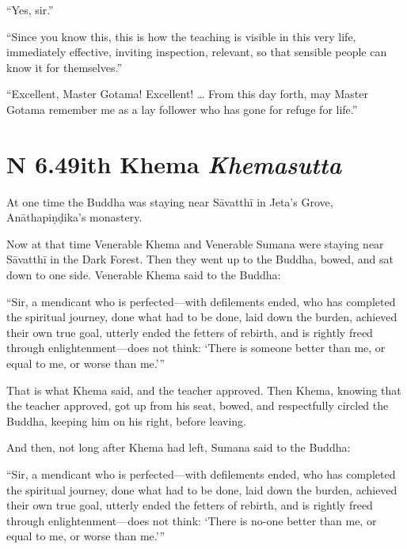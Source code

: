 \documentclass[12pt,openany]{book}%
\newcommand*{\suttatitleacronym}[1]{\smaller[2]{#1}\vspace*{.3em}}
\newcommand*{\suttatitletranslation}[1]{\linebreak{#1}}
\newcommand*{\suttatitleroot}[1]{\linebreak\smaller[2]\itshape{#1}}
\newcommand*{\tocacronym}[1]{\hspace*{-3.3em}{#1}\quad}
\newcommand*{\toctranslation}[1]{#1}
\newcommand*{\tocroot}[1]{(\textit{#1})}
\begin{document}
“Yes, sir.” 

“Since you know this, this is how the teaching is visible in this very life, immediately effective, inviting inspection, relevant, so that sensible people can know it for themselves.” 

“Excellent, Master Gotama! Excellent! … From this day forth, may Master Gotama remember me as a lay follower who has gone for refuge for life.” 

%
\section*{{\suttatitleacronym AN 6.49}{\suttatitletranslation With Khema }{\suttatitleroot Khemasutta}}
\addcontentsline{toc}{section}{\tocacronym{AN 6.49} \toctranslation{With Khema } \tocroot{Khemasutta}}

At one time the Buddha was staying near \textsanskrit{Sāvatthī} in Jeta’s Grove, \textsanskrit{Anāthapiṇḍika}’s monastery. 

Now at that time Venerable Khema and Venerable Sumana were staying near \textsanskrit{Sāvatthī} in the Dark Forest. Then they went up to the Buddha, bowed, and sat down to one side. Venerable Khema said to the Buddha: 

“Sir, a mendicant who is perfected—with defilements ended, who has completed the spiritual journey, done what had to be done, laid down the burden, achieved their own true goal, utterly ended the fetters of rebirth, and is rightly freed through enlightenment—does not think: ‘There is someone better than me, or equal to me, or worse than me.’” 

That is what Khema said, and the teacher approved. Then Khema, knowing that the teacher approved, got up from his seat, bowed, and respectfully circled the Buddha, keeping him on his right, before leaving. 

And then, not long after Khema had left, Sumana said to the Buddha: 

“Sir, a mendicant who is perfected—with defilements ended, who has completed the spiritual journey, done what had to be done, laid down the burden, achieved their own true goal, utterly ended the fetters of rebirth, and is rightly freed through enlightenment—does not think: ‘There is no-one better than me, or equal to me, or worse than me.’” 
\end{document}
